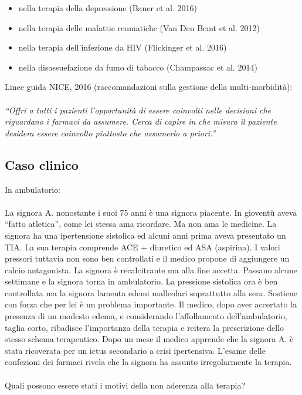\begin{itemize}
\item
  nella terapia della depressione (Bauer et al. 2016)
\item
  nella terapia delle malattie reumatiche (Van Den Bemt et al. 2012)
\item
  nella terapia dell'infezione da HIV (Flickinger et al. 2016)
\item
  nella disassuefazione da fumo di tabacco (Champassac et al. 2014)
\end{itemize}

Linee guida NICE, 2016 (raccomandazioni sulla gestione della
multi-morbidità):
\\\\
\emph{``Offri a tutti i pazienti l'opportunità di essere coinvolti nelle
decisioni che riguardano i farmaci da assumere. Cerca di capire in che
misura il paziente desidera essere coinvolto piuttosto che assumerlo a
priori.''}

\subsection{Caso clinico}

In ambulatorio:
\\\\
La signora A. nonostante i suoi 75 anni è una signora piacente. In
gioventù aveva ``fatto atletica'', come lei stessa ama ricordare. Ma non
ama le medicine. La signora ha una ipertensione sistolica ed alcuni anni
prima aveva presentato un TIA. La sua terapia comprende ACE + diuretico
ed ASA (aspirina). I valori pressori tuttavia non sono ben controllati e
il medico propone di aggiungere un calcio antagonista. La signora è
recalcitrante ma alla fine accetta. Passano alcune settimane e la
signora torna in ambulatorio. La pressione sistolica ora è ben
controllata ma la signora lamenta edemi malleolari soprattutto alla
sera. Sostiene con forza che per lei è un problema importante. Il
medico, dopo aver accertato la presenza di un modesto edema, e
considerando l'affollamento dell'ambulatorio, taglia corto, ribadisce
l'importanza della terapia e reitera la prescrizione dello stesso schema
terapeutico. Dopo un mese il medico apprende che la signora A. è stata
ricoverata per un ictus secondario a crisi ipertensiva. L'esame delle
confezioni dei farmaci rivela che la signora ha assunto irregolarmente
la terapia.
\\\\
Quali possono essere stati i motivi della non aderenza alla terapia?

